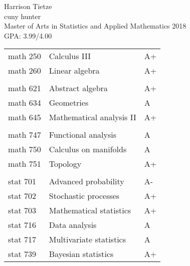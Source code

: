 \documentclass[12pt]{extreport}
\begin{document}
 \bfseries{\scshape 
\begin{center}
Harrison Tietze\\ \smallskip 
cuny hunter \\
Master of Arts in Statistics and Applied Mathematics 2018\\
GPA: 3.99/4.00
\end{center}
\begin{flushleft}

\begin{tabular}{ |p{2cm}|p{8cm}|p{5cm}  }
 math 250& Calculus III & A+ \\ 
 math 260 & Linear algebra & A+ \\
 \\  
 math 621 & Abstract algebra & A+\\
 math 634 & Geometries & A\\
 math 645 & Mathematical analysis II & A+\\
 \\
 math 747 & Functional analysis & A\\
 math 750 & Calculus on manifolds & A\\
 math 751 & Topology & A+\\
 \\
 stat 701& Advanced probability & A-\\
 stat 702 & Stochastic processes & A+\\   
 stat 703 & Mathematical statistics & A+\\
 stat 716 & Data analysis & A\\
 stat 717& Multivariate statistics & A\\
 stat 739& Bayesian statistics & A+
\end{tabular}
\end{flushleft}
}
\end{document}
